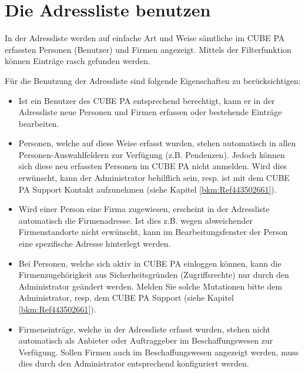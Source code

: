 
\clearpage
\section{Die Adressliste benutzen}
\label{bkm:Ref443738751}
In der Adressliste werden auf einfache Art und Weise sämtliche im CUBE PA erfassten Personen (Benutzer) und Firmen angezeigt. Mittels der Filterfunktion können Einträge rasch gefunden werden.

\vspace{\baselineskip}

Für die Benutzung der Adressliste sind folgende Eigenschaften zu berücksichtigen:

\begin{itemize}
\item
Ist ein Benutzer des CUBE PA entsprechend berechtigt, kann er in der Adressliste neue Personen und Firmen erfassen oder bestehende Einträge bearbeiten.

\item
Personen, welche auf diese Weise erfasst wurden, stehen automatisch in allen Personen-Auswahlfeldern zur Verfügung (z.B. Pendenzen). Jedoch können sich diese neu erfassten Personen im CUBE PA nicht anmelden. Wird dies erwünscht, kann der Administrator behilflich sein, resp. ist mit dem CUBE PA Support Kontakt aufzunehmen (siehe Kapitel
\ref{bkm:Ref443502661}).

\item
Wird einer Person eine Firma zugewiesen, erscheint in der Adressliste automatisch die Firmenadresse. Ist dies z.B. wegen abweichender Firmenstandorte nicht erwünscht, kann im Bearbeitungsfenster der Person eine spezifische Adresse
hinterlegt werden.

\item
Bei Personen, welche sich aktiv in CUBE PA einloggen können, kann die Firmenzugehörigkeit aus Sicherheitsgründen (Zugriffsrechte) nur durch den Administrator geändert werden. Melden Sie solche Mutationen bitte dem Administrator, resp. dem CUBE PA Support (siehe Kapitel \ref{bkm:Ref443502661}).

\item
Firmeneinträge, welche in der Adressliste erfasst wurden, stehen nicht automatisch als Anbieter oder Auftraggeber im Beschaffungswesen zur Verfügung. Sollen Firmen auch im Beschaffungswesen angezeigt werden, muss dies durch den Administrator entsprechend konfiguriert werden.
\end{itemize}

\pagebreak
